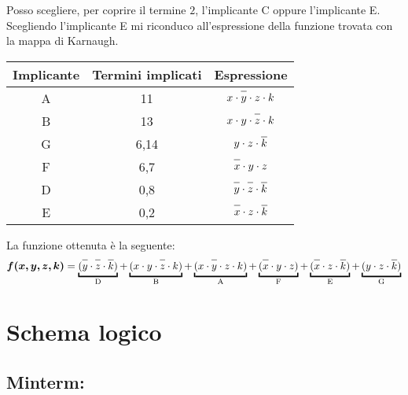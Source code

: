 \documentclass{article}
\newcommand*{\oline}[1]{\overline{#1\mathstrut}}
\begin{document}
\newpage

Posso scegliere, per coprire il termine $2$, l'implicante C oppure l'implicante E. Scegliendo l'implicante E mi riconduco all'espressione della funzione trovata con la mappa di Karnaugh.
\begin{center}
  \begin{table}[h]
    \makegapedcells
    \centering
    {
      \begin{tabular}{|c|c|c|}
        \hline
        \textbf{Implicante} & \textbf{Termini implicati} & \textbf{Espressione} \\
        \hline
          A & 11 & $x \cdot \oline{y} \cdot z \cdot k$ \\
        \hline
          B & 13 & $x \cdot y \cdot \oline{z} \cdot k$ \\
        \hline
          G & 6,14 & $y \cdot z \cdot \oline{k}$ \\
        \hline
          F & 6,7 & $\oline{x} \cdot y \cdot z$ \\
        \hline
          D & 0,8 & $\oline{y} \cdot \oline{z} \cdot \oline{k}$ \\
        \hline
          E & 0,2 & $\oline{x} \cdot z \cdot \oline{k}$ \\
        \hline
      \end{tabular}
    }
  \end{table}
\end{center}

La funzione ottenuta è la seguente:
\begin{align*}
  \bm{f(x,y,z,k)} = \underbracket{(\oline{y} \cdot \oline{z} \cdot \oline{k})}_{\text{D}} + \underbracket{(x \cdot y \cdot \oline{z} \cdot k)}_{\text{B}} + \underbracket{(x \cdot \oline{y} \cdot z \cdot k)}_{\text{A}} + \underbracket{(\oline{x} \cdot y \cdot z)}_{\text{F}} + \underbracket{(\oline{x} \cdot z \cdot \oline{k})}_{\text{E}} + \underbracket{(y \cdot z \cdot \oline{k})}_{\text{G}}
\end{align*}

\newpage

\section{Schema logico}

\bigskip

\subsection*{Minterm:}
\end{document}
